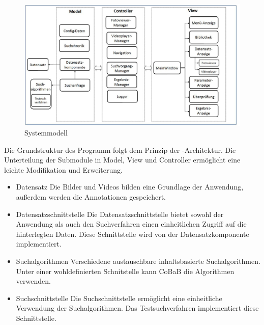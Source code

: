 \begin{figure}[h]
\includegraphics[width=1\linewidth]{img/sysmodell}
\caption{Systemmodell}
\label{fig:systemmodell}
\end{figure}
\vspace{10pt}

Die Grundstruktur des Programm folgt dem Prinzip der -Architektur. Die Unterteilung der Submodule in Model, View und Controller ermöglicht eine leichte Modifikation und Erweiterung.

\begin{itemize}
\item Datensatz\newline
Die Bilder und Videos bilden eine Grundlage der Anwendung, außerdem werden die  {Annotationen} gespeichert.
\item Datensatzschnittstelle\newline
Die Datensatzschnittstelle bietet sowohl der Anwendung als auch den Suchverfahren einen einheitlichen Zugriff auf die hinterlegten Daten. Diese Schnittstelle wird von der Datensatzkomponente implementiert.
\item Suchalgorithmen\newline
Verschiedene austauschbare inhaltsbasierte Suchalgorithmen. Unter einer wohldefinierten Schnitstelle kann CoBaB die Algorithmen verwenden.
\item Suchschnittstelle\newline
Die Suchschnittstelle ermöglicht eine einheitliche Verwendung der Suchalgorithmen. Das Testsuchverfahren implementiert diese Schnittstelle.
\end{itemize}

